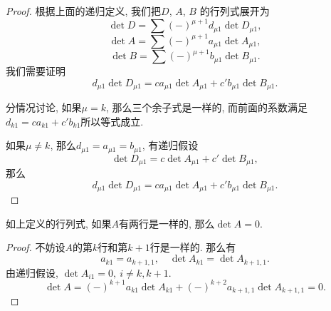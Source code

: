 \begin{proof}
    根据上面的递归定义, 我们把$D$, $A$, $B$ 的行列式展开为
    \begin{equation}
        \det D = \sum \left( - \right) ^{\mu + 1}d_{\mu 1} \det D_{\mu 1},
    \end{equation}
    \begin{equation}
      \det A = \sum \left( - \right) ^{\mu + 1}a_{\mu 1} \det A_{\mu 1},
    \end{equation}
    \begin{equation}
      \det B = \sum \left( - \right) ^{\mu + 1}b_{\mu 1} \det B_{\mu 1}.
    \end{equation}
    我们需要证明
    \begin{equation}
      d_{\mu 1} \det D_{\mu 1} = c a_{\mu 1} \det A_{\mu 1} + c' b_{\mu 1} \det B_{\mu 1}. 
    \end{equation}
    
    分情况讨论, 如果$\mu = k$, 那么三个余子式是一样的, 而前面的系数满足$d_{k 1} = c a_{k 1} + c' b_{k 1}$所以等式成立. 
    
    如果$\mu \neq k$, 那么$d_{\mu 1} = a_{\mu 1} = b_{\mu 1}$, 有递归假设
    \begin{equation}
      \det D_{\mu 1} = c \det A_{\mu 1} + c' \det B_{\mu 1},
    \end{equation}
    那么
    \begin{equation}
        d_{\mu 1} \det D_{\mu 1} = c a_{\mu 1} \det A_{\mu 1} + c' b_{\mu 1} \det B_{\mu 1}.
    \end{equation}
\end{proof}

\begin{proposition}
    如上定义的行列式, 如果$A$有两行是一样的, 那么$\det A = 0$.
\end{proposition}

\begin{proof}
    不妨设$A$的第$k$行和第$k+1$行是一样的. 那么有
    \begin{equation}
      a_{k 1} = a_{k+1 ,1}, \quad \det A_{k 1} = \det A_{k+1 ,1}.
    \end{equation}
    由递归假设, $\det A _{i 1} = 0, \ i \neq k, k+1$.
    \begin{equation}
      \det A = \left( - \right) ^{k + 1} a_{k 1} \det A_{k 1} + \left( - \right) ^{k + 2} a_{k+1 ,1} \det A_{k+1 ,1} = 0.
    \end{equation}
\end{proof}

